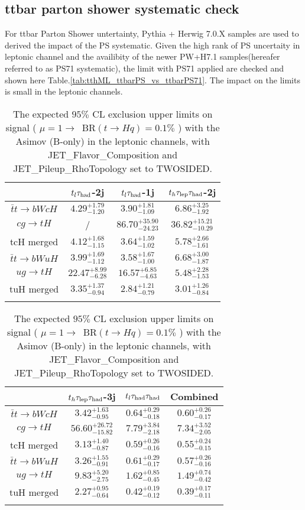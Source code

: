 \subsection{ ttbar parton shower systematic check}
For ttbar Parton Shower untertainty, Pythia + Herwig 7.0.X samples are used to derived the impact of the PS systematic. Given the high rank of PS uncertaity in leptonic channel and the availibity of the newer PW+H7.1 samples(hereafer referred to as PS71 systematic), the limit with PS71 applied are checked and shown here Table.\ref{tab:tthML_ttbarPS_vs_ttbarPS71}. The impact on the limits is small in the leptonic channels. 

\begin{table}[H]
\caption{The expected $95\%$ CL exclusion upper limits on signal ( $\mu=1\to$~BR$(t\to Hq)=0.1\%$ ) with the Asimov (B-only) in the leptonic channels,  with JET\_Flavor\_Composition and JET\_Pileup\_RhoTopology set to TWOSIDED.}
\label{tab:tthML_max_vs_twosided}
\centering
\begin{tabular}{cccc} \toprule\toprule
 & $t_l\tau_\text{had}$-2j & $t_l\tau_\text{had}$-1j & $t_h\tau_\text{lep}{}\tau_\text{had}$-2j\\\midrule
$\bar{t}t\to bWcH$ & $4.29^{+1.79}_{-1.20}$ & $3.90^{+1.81}_{-1.09}$ & $6.86^{+3.25}_{-1.92}$\\
$cg\to tH$ &  / & $86.70^{+35.90}_{-24.23}$ & $36.82^{+15.21}_{-10.29}$\\
tcH merged & $4.12^{+1.68}_{-1.15}$ & $3.64^{+1.59}_{-1.02}$ & $5.78^{+2.66}_{-1.61}$\\
$\bar{t}t\to bWuH$ & $3.99^{+1.69}_{-1.12}$ & $3.58^{+1.67}_{-1.00}$ & $6.68^{+3.00}_{-1.87}$\\
$ug\to tH$ & $22.47^{+8.99}_{-6.28}$ & $16.57^{+6.85}_{-4.63}$ & $5.48^{+2.28}_{-1.53}$\\
tuH merged & $3.35^{+1.37}_{-0.94}$ & $2.84^{+1.21}_{-0.79}$ & $3.01^{+1.26}_{-0.84}$\\
\bottomrule\bottomrule\\
\end{tabular}
\begin{tabular}{cccc} \toprule\toprule
 & $t_h\tau_\text{lep}{}\tau_\text{had}$-3j & $t_l\tau_\text{had}{}\tau_\text{had}$ & Combined\\\midrule
$\bar{t}t\to bWcH$ & $3.42^{+1.63}_{-0.95}$ & $0.64^{+0.29}_{-0.18}$ & $0.60^{+0.26}_{-0.17}$\\
$cg\to tH$ & $56.60^{+26.72}_{-15.82}$ & $7.79^{+3.84}_{-2.18}$ & $7.34^{+3.52}_{-2.05}$\\
tcH merged & $3.13^{+1.40}_{-0.87}$ & $0.59^{+0.26}_{-0.16}$ & $0.55^{+0.24}_{-0.15}$\\
$\bar{t}t\to bWuH$ & $3.26^{+1.55}_{-0.91}$ & $0.61^{+0.29}_{-0.17}$ & $0.57^{+0.26}_{-0.16}$\\
$ug\to tH$ & $9.83^{+5.20}_{-2.75}$ & $1.62^{+0.85}_{-0.45}$ & $1.49^{+0.74}_{-0.42}$\\
tuH merged & $2.27^{+0.95}_{-0.64}$ & $0.42^{+0.19}_{-0.12}$ & $0.39^{+0.17}_{-0.11}$\\
\bottomrule\bottomrule\\
\end{tabular}
\end{table}


